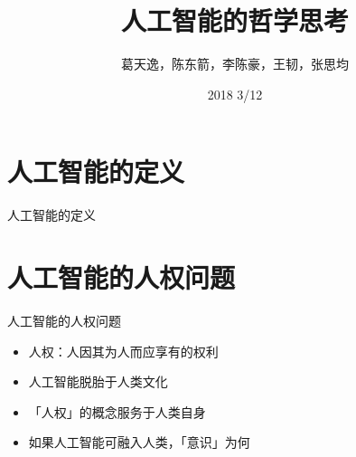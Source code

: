 \documentclass{beamer}
\title{人工智能的哲学思考}
\date{2018 3/12}
\author{葛天逸，陈东箭，李陈豪，王韧，张思均}
\institute{马克思主义基本原理概论课堂讨论}
\begin{document}
  \maketitle
  \tableofcontents
  \section{人工智能的定义}
  \begin{frame}{人工智能的定义}
  \end{frame}
  \section{人工智能的人权问题}
  \begin{frame}{人工智能的人权问题}
    \begin{itemize}
     \item 人权：人因其为人而应享有的权利 
     \item 人工智能脱胎于人类文化
     \item 「人权」的概念服务于人类自身  
     \item 如果人工智能可融入人类，「意识」为何
    \end{itemize}
  \end{frame}
  
\end{document}

